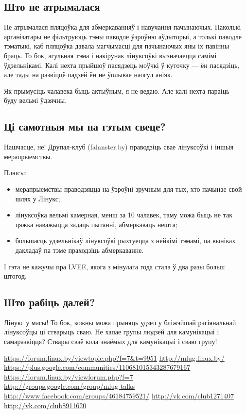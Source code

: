\documentclass[10pt, a5paper]{article}
\begin{document}
\subsection*{Што не атрымалася}

Не атрымалася пляцоўка для абмеркаванняў і навучання пачынаючых. Паколькі арганізатары не фільтруюць тэмы паводле ўзроўню аўдыторыі, а толькі паводле тэматыкі, каб пляцоўка давала магчымасці для пачынаючых яны іх павінны браць. То бок, агульная тэма і накірунак лінуксоўкі вызначаецца самімі ўдзельнікамі. Калі нехта прыйшоў пасядзець моўчкі ў куточку — ён пасядзіць, але тады на развіццё падзей ён не ўплывае наогул аніяк.

Як прымусіць чалавека быць актыўным, я не ведаю. Але калі нехта параіць — буду вельмі ўдзячны.

\subsection*{Ці самотныя мы на гэтым свеце?}

Нашчасце, не! Друпал-клуб (falanster.by) праводзіць свае лінуксоўкі і іншыя мерапрыемствы.

Плюсы:

\begin{itemize}
  \item мерапрыемствы праводзяцца на ўзроўні зручным для тых, хто пачынае свой шлях у Лінукс;
  \item лінуксоўка вельмі камерная, менш за 10 чалавек, таму можа быць не так цяжка наважыцца задаць пытанні, абмеркаваць нешта;
  \item большасць удзельнікаў лінуксоўкі рыхтуецца з нейкімі тэмамі, па выніках дакладаў па тэме праходзіць абмеркаванне.
\end{itemize}

І гэта не кажучы пра LVEE, якога з мінулага года стала ў два разы больш штогод.

\subsection*{Што рабіць далей?}

Лінукс у масы! То бок, кожны можа прыняць удзел у бліжэйшай рэгіянальнай лінуксоўцы ці стварыць сваю. Не хапае групы людзей для камунікацыі і самаразвіцця? Ствары сваё кола знаёмых для камунікацыі і сваю групу!

\let\saverefname=\refname%
\def\refname{Спасылкі}%
\begin{thebibliography}{9}
 \url{https://forum.linux.by/viewtopic.php?f=7\&t=9951}
 \url{http://mlug.linux.by/}
 \url{https://plus.google.com/communities/110681015343287679167}
 \url{https://forum.linux.by/viewforum.php?f=7}
 \url{http://groups.google.com/group/mlug-talks}
 \url{http://www.facebook.com/groups/46184759521/}
 \url{http://vk.com/club1271407}
 \url{http://vk.com/club8911620}
\end{thebibliography}
\let\refname=\saverefname%
\end{document}
